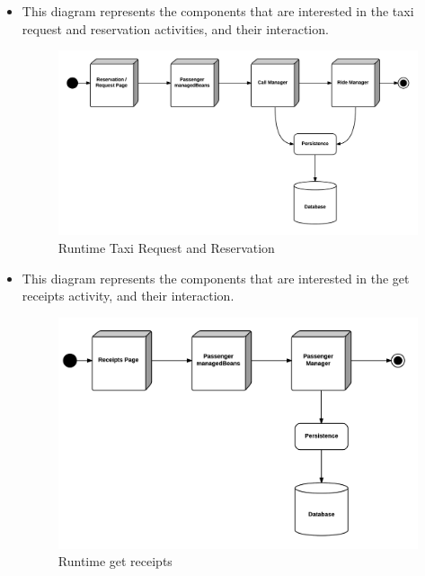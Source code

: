 \begin{itemize}
	\item This diagram represents the components that are interested in the taxi request and reservation activities, and their interaction.
	\begin{figure}[htbp]
	\centering
	\includegraphics[width=\textwidth]{cpt/img/RuntimeReqResView}
	\caption{Runtime Taxi Request and Reservation}
	\end{figure}
	\clearpage
	
	\item This diagram represents the components that are interested in the get receipts activity, and their interaction.
	\begin{figure}[htbp]
	\centering
	\includegraphics[width=\textwidth]{cpt/img/RuntimeReceiptsView}
	\caption{Runtime get receipts}
	\end{figure}
	\clearpage
	

\end{itemize}

